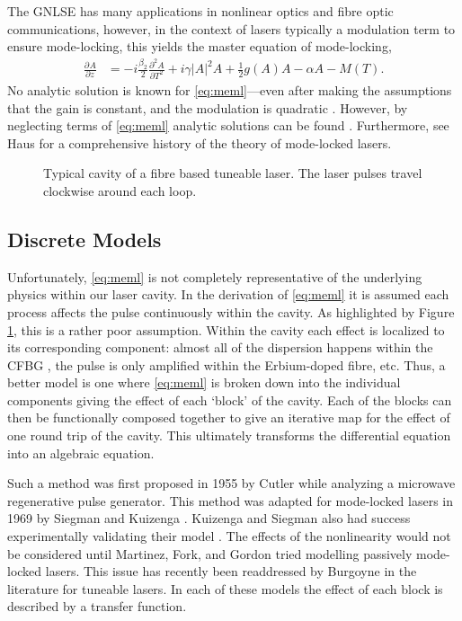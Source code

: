 \documentclass[10pt,twocolumn,a4paper]{article}
\newcommand{\pdiff}[3][]{\frac{\partial^{#1}#2}{\partial{#3}^{#1}}}
\begin{document}
The GNLSE has many applications in nonlinear optics and fibre optic communications, however, in the context of lasers typically a modulation term to ensure mode-locking, this yields the master equation of mode-locking, \cite{hausbook, haus1975, haus1986, haus1992, haus2000, tamura1996, usechak}
\begin{align}
	\pdiff{A}{z} &= - i \frac{\beta_2}{2}\pdiff[2]{A}{T} + i \gamma |A|^2 A + \frac{1}{2}g(A) A - \alpha A - M(T).
	\label{eq:meml}
\end{align}
No analytic solution is known for \eqref{eq:meml}---even after making the assumptions that the gain is constant, and the modulation is quadratic \cite{hausbook, haus1975, haus1996}. However, by neglecting terms of \eqref{eq:meml} analytic solutions can be found \cite{burgoyne2014, haus1975, haus1986, haus1991, haus1992, haus1996, tamura1996, usechak}. Furthermore, see Haus \cite{haus2000} for a comprehensive history of the theory of mode-locked lasers.

\begin{figure}[tbp]
	\centering
	
	\caption{Typical cavity of a fibre based tuneable laser. The laser pulses travel clockwise around each loop.}
	\label{fig:cavity}
\end{figure}

\subsection{Discrete Models}
\label{sec:discrete}
Unfortunately, \eqref{eq:meml} is not completely representative of the underlying physics within our laser cavity. In the derivation of \eqref{eq:meml} it is assumed each process affects the pulse continuously within the cavity. As highlighted by Figure \ref{fig:cavity}, this is a rather poor assumption. Within the cavity each effect is localized to its corresponding component: almost all of the dispersion happens within the CFBG \cite{agrawal2002}, the pulse is only amplified within the Erbium-doped fibre, etc. Thus, a better model is one where \eqref{eq:meml} is broken down into the individual components giving the effect of each `block' of the cavity. Each of the blocks can then be functionally composed together to give an iterative map for the effect of one round trip of the cavity. This ultimately transforms the differential equation into an algebraic equation.

Such a method was first proposed in 1955 by Cutler \cite{cutler} while analyzing a microwave regenerative pulse generator. This method was adapted for mode-locked lasers in 1969 by Siegman and Kuizenga \cite{kuizenga1970a, siegman}. Kuizenga and Siegman also had success experimentally validating their model \cite{kuizenga1970b, kuizenga1970}. The effects of the nonlinearity would not be considered until Martinez, Fork, and Gordon \cite{martinez1984, martinez1985} tried modelling passively mode-locked lasers. This issue has recently been readdressed by Burgoyne \cite{burgoyne2014} in the literature for tuneable lasers. In each of these models the effect of each block is described by a transfer function.
\end{document}
